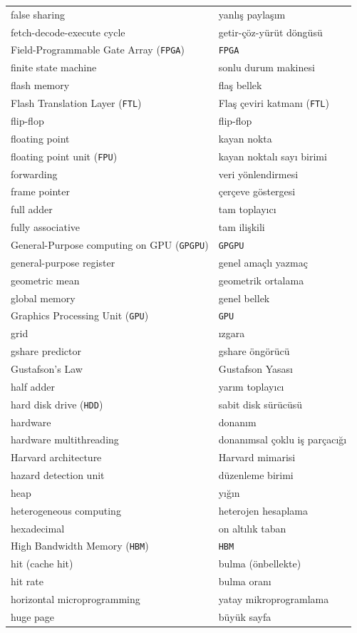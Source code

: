 {\begin{longtable}{@{}p{7.6cm}p{7.6cm}@{}}
false sharing & yanlış paylaşım \\
fetch-decode-execute cycle & getir-çöz-yürüt döngüsü \\
Field-Programmable Gate Array (\texttt{FPGA}) & \texttt{FPGA} \\
finite state machine & sonlu durum makinesi \\
flash memory & flaş bellek \\
Flash Translation Layer (\texttt{FTL}) & Flaş çeviri katmanı (\texttt{FTL}) \\
flip-flop & flip-flop \\
floating point & kayan nokta \\
floating point unit (\texttt{FPU}) & kayan noktalı sayı birimi \\
forwarding & veri yönlendirmesi \\
frame pointer & çerçeve göstergesi \\
full adder & tam toplayıcı \\
fully associative & tam ilişkili \\

General-Purpose computing on GPU (\texttt{GPGPU}) & \texttt{GPGPU} \\
general-purpose register & genel amaçlı yazmaç \\
geometric mean & geometrik ortalama \\
global memory & genel bellek \\
Graphics Processing Unit (\texttt{GPU}) & \texttt{GPU} \\
grid & ızgara \\
gshare predictor & gshare öngörücü \\
Gustafson's Law & Gustafson Yasası \\

half adder & yarım toplayıcı \\
hard disk drive (\texttt{HDD}) & sabit disk sürücüsü \\
hardware & donanım \\
hardware multithreading & donanımsal çoklu iş parçacığı \\
Harvard architecture & Harvard mimarisi \\
hazard detection unit & düzenleme birimi \\
heap & yığın \\
heterogeneous computing & heterojen hesaplama \\
hexadecimal & on altılık taban \\
High Bandwidth Memory (\texttt{HBM}) & \texttt{HBM} \\
hit (cache hit) & bulma (önbellekte) \\
hit rate & bulma oranı \\
horizontal microprogramming & yatay mikroprogramlama \\
huge page & büyük sayfa \\


\end{longtable}}
